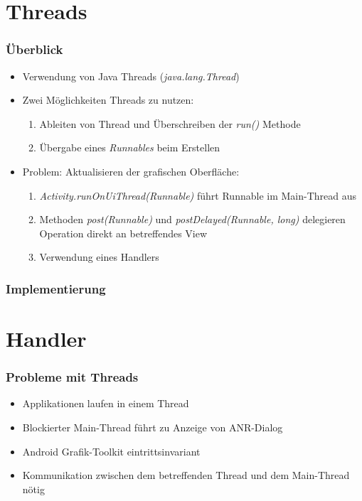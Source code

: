 \section{Threads}
\begin{frame}
   \frametitle{Überblick}
   \begin{itemize}
      \item Verwendung von Java Threads (\emph{java.lang.Thread})
      \item Zwei Möglichkeiten Threads zu nutzen:
      	\begin{enumerate}
      		\item Ableiten von Thread und Überschreiben der \emph{run()} Methode
      		\item Übergabe eines \emph{Runnables} beim Erstellen 
      	\end{enumerate}
      \item Problem: Aktualisieren der grafischen Oberfläche:
      	\begin{enumerate}
      		\item \emph{Activity.runOnUiThread(Runnable)} führt Runnable 
      			im Main-Thread aus
      		\item Methoden \emph{post(Runnable)} und \emph{postDelayed(Runnable, long)} 
					delegieren Operation direkt an betreffendes View
      		\item Verwendung eines Handlers
      	\end{enumerate}
   \end{itemize}
\end{frame}

\begin{frame}
   \frametitle{Implementierung}
	
\end{frame}

\section{Handler}
\begin{frame}
   \frametitle{Probleme mit Threads}
   \begin{itemize}
     	\item Applikationen laufen in einem Thread
     	\item Blockierter Main-Thread führt zu Anzeige von ANR-Dialog
      \item Android Grafik-Toolkit eintrittsinvariant
      \item Kommunikation zwischen dem betreffenden Thread und dem Main-Thread 
      	nötig
   \end{itemize}
\end{frame}


